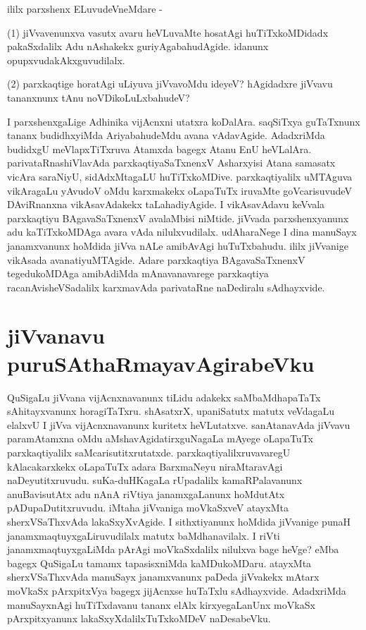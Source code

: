 ililx parxshenx ELuvudeVneMdare -

(1) jiVvavenunxva vasutx avaru heVLuvaMte hosatAgi huTiTxkoMDidadx pakaSxdalilx Adu nAshakekx guriyAgabahudAgide. idanunx opupxvudakAkxguvudilalx. 

(2) parxkaqtige horatAgi uLiyuva jiVvavoMdu ideyeV? hAgidadxre jiVvavu tananxnunx tAnu noVDikoLuLxbahudeV? 

I parxshenxgaLige Adhinika vijAcnxni utatxra koDalAra. saqSiTxya guTaTxnunx tananx budidhxyiMda AriyabahudeMdu avana vAdavAgide. AdadxriMda budidxgU meVlapxTiTxruva Atamxda bagegx Atanu EnU heVLalAra. parivataRnashiVlavAda parxkaqtiyaSaTxnenxV Asharxyisi Atana samasatx vicAra saraNiyU, sidAdxMtagaLU huTiTxkoMDive. parxkaqtiyalilx uMTAguva vikAragaLu yAvudoV oMdu karxmakekx oLapaTuTx iruvaMte goVcarisuvudeV DAviRnanxna vikAsavAdakekx taLahadiyAgide. I vikAsavAdavu keVvala parxkaqtiyu BAgavaSaTxnenxV avalaMbisi niMtide. jiVvada parxshenxyanunx adu kaTiTxkoMDAga avara vAda nilulxvudilalx. udAharaNege I dina manuSayx janamxvanunx hoMdida jiVva nALe amibAvAgi huTuTxbahudu. ililx jiVvanige vikAsada avanatiyuMTAgide. Adare parxkaqtiya BAgavaSaTxnenxV tegedukoMDAga amibAdiMda mAnavanavarege parxkaqtiya racanAvisheVSadalilx karxmavAda parivataRne naDediralu sAdhayxvide.

\section*{jiVvanavu puruSAthaRmayavAgirabeVku}

QuSigaLu jiVvana vijAcnxnavanunx tiLidu adakekx saMbaMdhapaTaTx sAhitayxvanunx horagiTaTxru. shAsatxrX, upaniSatutx matutx veVdagaLu elalxvU I jiVva vijAcnxnavanunx kuritetx heVLutatxve. sanAtanavAda jiVvavu paramAtamxna oMdu aMshavAgidatirxguNagaLa mAyege oLapaTuTx parxkaqtiyalilx saMcarisutitxrutatxde. parxkaqtiyalilxruvavaregU kAlacakarxkekx oLapaTuTx adara BarxmaNeyu niraMtaravAgi naDeyutitxruvudu. suKa-duHKagaLa rUpadalilx kamaRPalavanunx anuBavisutAtx adu nAnA riVtiya janamxgaLanunx hoMdutAtx pADupaDutitxruvudu. iMtaha jiVvaniga moVkaSxveV atayxMta sherxVSaThxvAda lakaSxyXvAgide. I sithxtiyanunx hoMdida jiVvanige punaH janamxmaqtuyxgaLiruvudilalx matutx baMdhanavilalx. I riVti janamxmaqtuyxgaLiMda pArAgi moVkaSxdalilx nilulxva bage heVge? eMba bagegx QuSigaLu tamamx tapasisxniMda kaMDukoMDaru. atayxMta sherxVSaThxvAda manuSayx janamxvanunx paDeda jiVvakekx mAtarx moVkaSx pArxpitxVya bagegx jijAcnxse huTaTxlu sAdhayxvide. AdadxriMda manuSayxnAgi huTiTxdavanu tananx elAlx‌ kirxyegaLanUnx moVkaSx pArxpitxyanunx lakaSxyXdalilxTuTxkoMDeV naDesabeVku.

